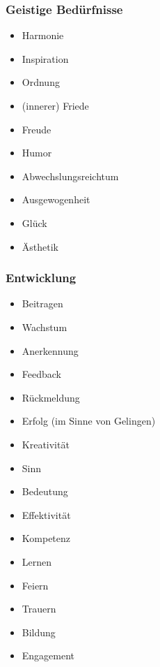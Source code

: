 \subsubsection{Geistige Bedürfnisse}

\begin{multicols}{2}
  \begin{itemize}
    \item Harmonie
    \item Inspiration
    \item \glqq Ordnung\grqq
    \item (innerer) Friede
    \item Freude
    \item Humor
    \item Abwechslungsreichtum
    \item Ausgewogenheit
    \item Glück
    \item Ästhetik
  \end{itemize}
\end{multicols}


\subsubsection{Entwicklung}

\begin{multicols}{2}
  \begin{itemize}
    \item Beitragen
    \item Wachstum
    \item Anerkennung
    \item Feedback
    \item Rückmeldung
    \item Erfolg (im Sinne von \glqq Gelingen\grqq)
    \item Kreativität
    \item Sinn
    \item Bedeutung
    \item Effektivität
    \item Kompetenz
    \item Lernen
    \item Feiern
    \item Trauern
    \item Bildung
    \item Engagement
  \end{itemize}
\end{multicols}
